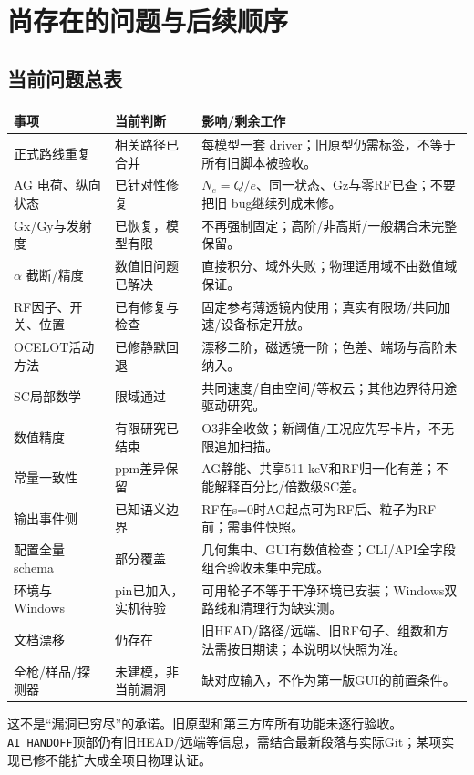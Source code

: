 \section{尚存在的问题与后续顺序}\label{sec:issues}
\subsection{当前问题总表}
\begin{longtable}{P{30mm}P{33mm}P{87mm}}\toprule
事项 & 当前判断 & 影响/剩余工作 \\ \midrule\endhead
正式路线重复 & 相关路径已合并 & 每模型一套 driver；旧原型仍需标签，不等于所有旧脚本被验收。\\
AG 电荷、纵向状态 & 已针对性修复 & $N_e=Q/e$、同一状态、Gz与零RF已查；不要把旧 bug继续列成未修。\\
Gx/Gy与发射度 & 已恢复，模型有限 & 不再强制固定；高阶/非高斯/一般耦合未完整保留。\\
$\alpha$ 截断/精度 & 数值旧问题已解决 & 直接积分、域外失败；物理适用域不由数值域保证。\\
RF因子、开关、位置 & 已有修复与检查 & 固定参考薄透镜内使用；真实有限场/共同加速/设备标定开放。\\
OCELOT活动方法 & 已修静默回退 & 漂移二阶，磁透镜一阶；色差、端场与高阶未纳入。\\
SC局部数学 & 限域通过 & 共同速度/自由空间/等权云；其他边界待用途驱动研究。\\
数值精度 & 有限研究已结束 & O3非全收敛；新阈值/工况应先写卡片，不无限追加扫描。\\
常量一致性 & ppm差异保留 & AG静能、共享511 keV和RF归一化有差；不能解释百分比/倍数级SC差。\\
输出事件侧 & 已知语义边界 & RF在s=0时AG起点可为RF后、粒子为RF前；需事件快照。\\
配置全量schema & 部分覆盖 & 几何集中、GUI有数值检查；CLI/API全字段组合验收未集中完成。\\
环境与Windows & pin已加入，实机待验 & 可用轮子不等于干净环境已安装；Windows双路线和清理行为缺实测。\\
文档漂移 & 仍存在 & 旧HEAD/路径/远端、旧RF句子、组数和方法需按日期读；本说明以快照为准。\\
全枪/样品/探测器 & 未建模，非当前漏洞 & 缺对应输入，不作为第一版GUI的前置条件。\\
\bottomrule\end{longtable}
这不是“漏洞已穷尽”的承诺。旧原型和第三方库所有功能未逐行验收。\texttt{AI\_HANDOFF}顶部仍有旧HEAD/远端等信息，需结合最新段落与实际Git；某项实现已修不能扩大成全项目物理认证。

